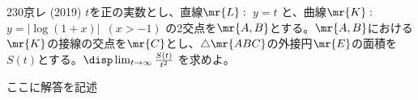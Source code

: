 \begin{prob}{230}{}{京レ (2019)}
 $t$を正の実数とし、直線$\mr{L}:$~$y=t$ と、曲線$\mr{K}:$~$y=\left|\log (1+x)\right|$~$(x>-1)$ の2交点を$\mr{A, B}$とする。$\mr{A, B}$における$\mr{K}$の接線の交点を$\mr{C}$とし、$\triangle\mr{ABC}$の外接円$\mr{E}$の面積を$S(t)$とする。$\disp \lim_{t\to\infty} \frac{S(t)}{t^2}$ を求めよ。
\end{prob}
ここに解答を記述